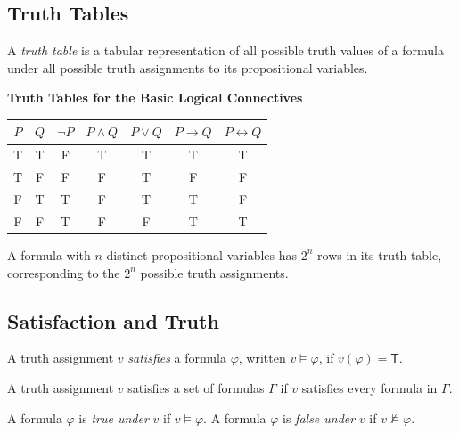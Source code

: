 \subsection{Truth Tables}

\begin{definition}
A \emph{truth table} is a tabular representation of all possible truth values
of a formula under all possible truth assignments to its propositional variables.
\end{definition}

\begin{center}
\textbf{Truth Tables for the Basic Logical Connectives}

\vspace{0.5em}
\renewcommand{\arraystretch}{1.2}
\begin{tabular}{|c|c||c|c|c|c|c|}
\hline
$P$ & $Q$ & $\neg P$ & $P \wedge Q$ & $P \vee Q$ & $P \rightarrow Q$ & $P \leftrightarrow Q$ \\
\hline
T & T & F & T & T & T & T \\
T & F & F & F & T & F & F \\
F & T & T & F & T & T & F \\
F & F & T & F & F & T & T \\
\hline
\end{tabular}
\end{center}

\begin{remark}
A formula with $n$ distinct propositional variables has $2^n$ rows in its truth
table, corresponding to the $2^n$ possible truth assignments.
\end{remark}

\subsection{Satisfaction and Truth}

\begin{definition}[Satisfaction]
A truth assignment $v$ \emph{satisfies} a formula $\varphi$, written
$v \models \varphi$, if $v(\varphi) = \mathsf{T}$.

A truth assignment $v$ satisfies a set of formulas $\Gamma$ if $v$ satisfies
every formula in $\Gamma$.
\end{definition}

\begin{definition}
A formula $\varphi$ is \emph{true under} $v$ if $v \models \varphi$.
A formula $\varphi$ is \emph{false under} $v$ if $v \not\models \varphi$.
\end{definition}

